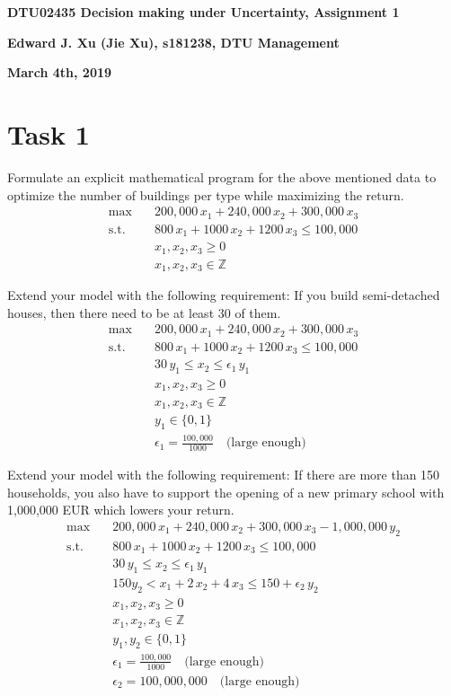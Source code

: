 \documentclass[fleqn,10pt]{wlscirep}
\begin{document}
\flushbottom
{\noindent \LARGE \textbf{DTU02435 Decision making under Uncertainty, Assignment 1}}

{\noindent \large \textbf{Edward J. Xu (Jie Xu), s181238, DTU Management}}

{\noindent \large \textbf{March 4th, 2019}}

\section{Task 1}

Formulate an explicit mathematical program for the above mentioned data to optimize the number of buildings per type while maximizing the return.
\begin{align}
    \max \quad& 200,000 \, x_1 + 240,000 \, x_2 + 300,000 \, x_3 \\
    \text{s.t.} \quad& 800 \, x_1 + 1000 \, x_2 + 1200 \, x_3 \leq 100,000 \\
    & x_1, x_2, x_3 \geq 0 \\
    & x_1, x_2, x_3 \in \mathbb{Z}
\end{align}

Extend your model with the following requirement: If you build semi-detached houses, then there need to be at least 30 of them.
\begin{align}
    \max \quad& 200,000 \, x_1 + 240,000 \, x_2 + 300,000 \, x_3 \\
    \text{s.t.} \quad& 800 \, x_1 + 1000 \, x_2 + 1200 \, x_3 \leq 100,000 \\
    & 30 \, y_1 \leq x_2 \leq \epsilon_1 \, y_1 \\
    & x_1, x_2, x_3 \geq 0 \\
    & x_1, x_2, x_3 \in \mathbb{Z} \\
    & y_1 \in \{0, 1 \} \\
    & \epsilon_1 = \frac{100,000}{1000} \quad \text{(large enough)}
\end{align}

Extend your model with the following requirement: If there are more than 150 households, you also have to support the opening of a new primary school with 1,000,000 EUR which lowers your return.
\begin{align}
    \max \quad& 200,000 \, x_1 + 240,000 \, x_2 + 300,000 \, x_3 - 1,000,000 \, y_2 \\
    \text{s.t.} \quad& 800 \, x_1 + 1000 \, x_2 + 1200 \, x_3 \leq 100,000 \\
    & 30 \, y_1 \leq x_2 \leq \epsilon_1 \, y_1 \\
    & 150 y_2 < x_1 + 2 \, x_2 + 4 \, x_3 \leq 150 + \epsilon_2 \, y_2 \\
    & x_1, x_2, x_3 \geq 0 \\
    & x_1, x_2, x_3 \in \mathbb{Z} \\
    & y_1, y_2 \in \{0, 1 \} \\
    & \epsilon_1 = \frac{100,000}{1000} \quad \text{(large enough)} \\
    & \epsilon_2 = 100,000,000 \quad \text{(large enough)}
\end{align}
\end{document}
